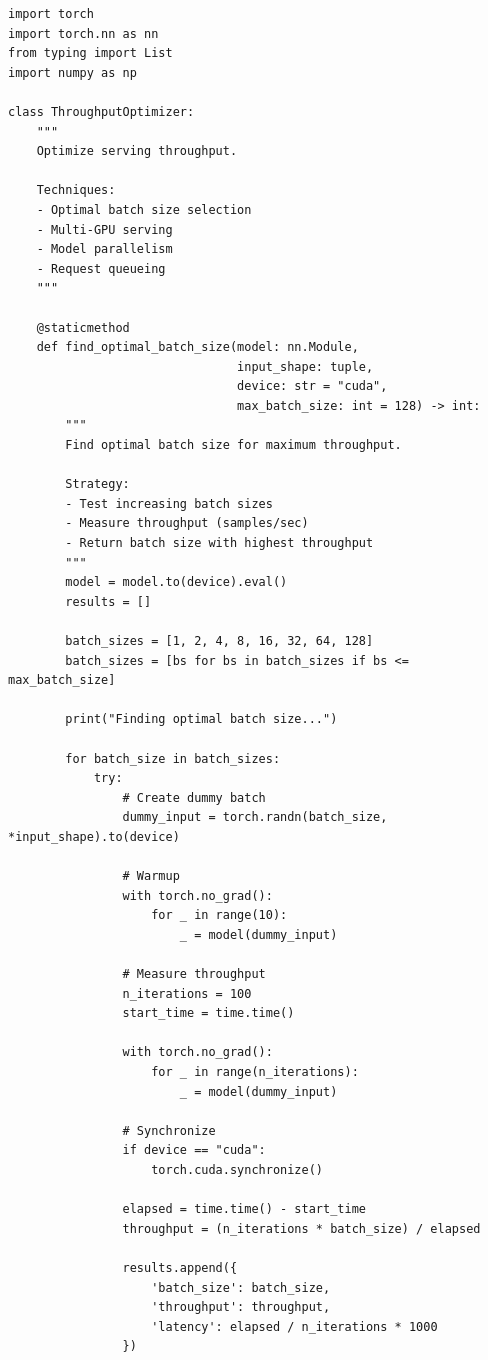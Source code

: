 \begin{lstlisting}[style=python, caption=Throughput optimization techniques]
import torch
import torch.nn as nn
from typing import List
import numpy as np

class ThroughputOptimizer:
    """
    Optimize serving throughput.

    Techniques:
    - Optimal batch size selection
    - Multi-GPU serving
    - Model parallelism
    - Request queueing
    """

    @staticmethod
    def find_optimal_batch_size(model: nn.Module,
                                input_shape: tuple,
                                device: str = "cuda",
                                max_batch_size: int = 128) -> int:
        """
        Find optimal batch size for maximum throughput.

        Strategy:
        - Test increasing batch sizes
        - Measure throughput (samples/sec)
        - Return batch size with highest throughput
        """
        model = model.to(device).eval()
        results = []

        batch_sizes = [1, 2, 4, 8, 16, 32, 64, 128]
        batch_sizes = [bs for bs in batch_sizes if bs <= max_batch_size]

        print("Finding optimal batch size...")

        for batch_size in batch_sizes:
            try:
                # Create dummy batch
                dummy_input = torch.randn(batch_size, *input_shape).to(device)

                # Warmup
                with torch.no_grad():
                    for _ in range(10):
                        _ = model(dummy_input)

                # Measure throughput
                n_iterations = 100
                start_time = time.time()

                with torch.no_grad():
                    for _ in range(n_iterations):
                        _ = model(dummy_input)

                # Synchronize
                if device == "cuda":
                    torch.cuda.synchronize()

                elapsed = time.time() - start_time
                throughput = (n_iterations * batch_size) / elapsed

                results.append({
                    'batch_size': batch_size,
                    'throughput': throughput,
                    'latency': elapsed / n_iterations * 1000
                })


\end{lstlisting}
